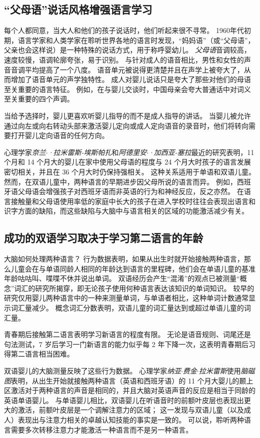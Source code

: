 \subsection{“父母语”说话风格增强语言学习}

每个人都同意，当大人和他们的孩子说话时，他们听起来很不寻常。
1960年代初期，语言学家和人类学家在聆听世界各地的语言时发现，“妈妈语”（或“父母语”，父亲也会这样说）是一种特殊的说话方式，用于称呼婴幼儿。
\textit{父母语}音调较高，速度较慢，语调轮廓夸张，易于识别。
与针对成人的语音相比，男性和女性的声音音调平均提高了一个八度。
语音单元被说得更清楚并且在声学上被夸大了，从而增加了语音单元的声学独特性。
成人对婴儿说话只是夸大了那些对他们的母语至关重要的语言特征。
例如，在与婴儿交谈时，中国母亲会夸大普通话中对词义至关重要的四个声调。


当给予选择时，婴儿更喜欢听婴儿指导的而不是成人指导的讲话。
当婴儿被允许通过向左或向右转动头部来激活婴儿定向或成人定向语音的录音时，他们将转向需要打开婴儿定向语音的任何方向。


心理学家\textit{奈兰$\cdot$·拉米雷斯-埃斯帕扎}和\textit{阿德里安$\cdot$·加西亚-塞拉}最近的研究表明，11 个月和 14 个月大的婴儿在家中使用父母语的程度与 24 个月大时孩子的语言发展密切相关，并且在 36 个月大时仍保持强相关。
这种关系适用于单语和双语儿童。
然而，在双语儿童中，两种语言的早期进步因父母所说的语言而异。
例如，西班牙语父母语会增强孩子对西班牙语而非英语的行为和神经反应，反之亦然。
在语言接触量和父母语使用率低的家庭中长大的孩子在进入学校时往往会表现出语言和识字方面的缺陷，而这些缺陷与大脑中与语言相关的区域的功能激活减少有关。



\subsection{成功的双语学习取决于学习第二语言的年龄}

大脑如何处理两种语言？
行为数据表明，如果从出生时就开始接触两种语言，那么儿童会在与单语同龄人相同的年龄达到语言的里程碑，他们会在单语儿童的基准年龄咕咕叫、喋喋不休并说出单词。
双语经历会产生“混淆”的观点已被测量“概念”词汇的研究所揭穿，即无论孩子使用何种语言表达该知识的单词知识。
较早的研究仅用婴儿两种语言中的一种来测量单词，与单语者相比，这种单词计数通常显示词汇量减少。
概念词汇分数表明，双语儿童的词汇量达到或超过单语儿童的词汇量。


青春期后接触第二语言表明学习新语言的程度有限。
无论是语音规则、词尾还是句法测试，7 岁后学习一门新语言的能力似乎每 2 年下降一次，这表明青春期后习得第二语言相当困难。


双语婴儿的大脑测量反映了这些行为数据。
心理学家\textit{纳亚$\cdot$费金$\cdot$拉米雷斯}使用\textit{脑磁图}表明，从出生开始就接触两种语言（英语和西班牙语）的 11 个月大婴儿的颞上区激活对于两种语言的声音是相同的，并且大脑对英语声音的反应是相当于同龄的英语单语婴儿。
与单语婴儿相比，双语婴儿在听语音时的前额叶皮层也表现出更大的激活，前额叶皮层是一个调解注意力的区域；
这一发现与双语儿童（以及成人）表现出与注意力相关的卓越认知技能的事实是一致的。
可以说，聆听两种语言需要多次转移注意力才能激活一种语言而不是另一种语言。


